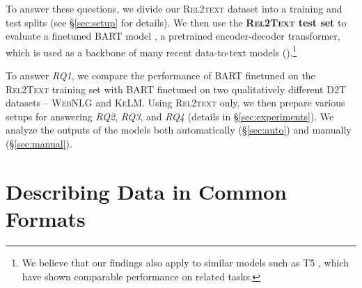 To answer these questions, we divide our \textsc{Rel2text} dataset into a training and test splits (see §\ref{sec:setup} for details). We then use the \textbf{\textsc{Rel2Text} test set} to evaluate a finetuned BART model \cite{lewis2020bart}, a pretrained encoder-decoder transformer, which is used as a backbone of many recent data-to-text models (\citealp{ke2021jointgt,xing2021structure,ribeiro2020investigating,liu2021kg}).\footnote{We believe that our findings also apply to similar models such as T5 \cite{raffel2020exploring}, which have shown comparable performance on related tasks.}

To answer \textit{RQ1}, we compare the performance of BART finetuned on the \textsc{Rel2Text} training set with BART finetuned on two qualitatively different D2T datasets -- \textsc{WebNLG} and \textsc{KeLM}. Using \textsc{Rel2text} only, we then prepare various setups for answering \textit{RQ2}, \textit{RQ3}, and \textit{RQ4} (details in §\ref{sec:experiments}). We analyze the outputs of the models  both automatically (§\ref{sec:auto}) and manually (§\ref{sec:manual}).





\section{Describing Data in Common Formats}
\label{sec:quintd}